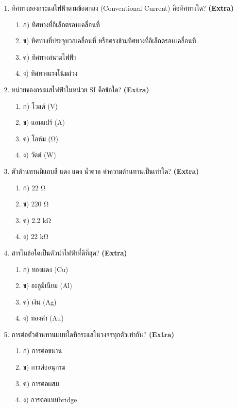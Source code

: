 \documentclass[12pt]{article}
\begin{document}
\begin{enumerate}[label=\arabic*.]
\begin{enumerate}[label=)]
\item ค) 500 W
\item ง) 1000 W
\end{enumerate}
\item ทิศทางของกระแสไฟฟ้าตามข้อตกลง (Conventional Current) คือทิศทางใด? \hfill \textbf{\small (Extra)}
\begin{enumerate}[label=)]
\item ก) ทิศทางที่อิเล็กตรอนเคลื่อนที่
\item ข) ทิศทางที่ประจุบวกเคลื่อนที่ หรือตรงข้ามทิศทางที่อิเล็กตรอนเคลื่อนที่
\item ค) ทิศทางสนามไฟฟ้า
\item ง) ทิศทางแรงโน้มถ่วง
\end{enumerate}
\item หน่วยของกระแสไฟฟ้าในหน่วย SI คือข้อใด? \hfill \textbf{\small (Extra)}
\begin{enumerate}[label=)]
\item ก) โวลต์ (V)
\item ข) แอมแปร์ (A)
\item ค) โอห์ม (Ω)
\item ง) วัตต์ (W)
\end{enumerate}
\item ตัวต้านทานมีแถบสี แดง แดง น้ำตาล ค่าความต้านทานเป็นเท่าใด? \hfill \textbf{\small (Extra)}
\begin{enumerate}[label=)]
\item ก) 22 Ω
\item ข) 220 Ω
\item ค) 2.2 kΩ
\item ง) 22 kΩ
\end{enumerate}
\item สารในข้อใดเป็นตัวนำไฟฟ้าที่ดีที่สุด? \hfill \textbf{\small (Extra)}
\begin{enumerate}[label=)]
\item ก) ทองแดง (Cu)
\item ข) อะลูมิเนียม (Al)
\item ค) เงิน (Ag)
\item ง) ทองคำ (Au)
\end{enumerate}
\item การต่อตัวต้านทานแบบใดที่กระแสในวงจรทุกตัวเท่ากัน? \hfill \textbf{\small (Extra)}
\begin{enumerate}[label=)]
\item ก) การต่อขนาน
\item ข) การต่ออนุกรม
\item ค) การต่อผสม
\item ง) การต่อแบบbridge

\end{enumerate}
\end{enumerate}
\end{document}

